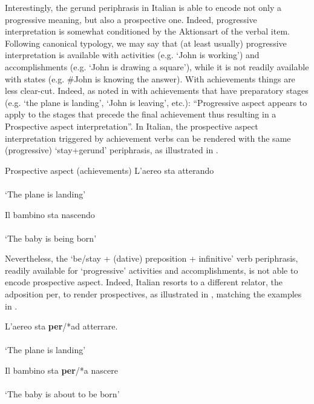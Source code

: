 \documentclass[output=paper,modfonts,nonflat,newtxmath,colorlinks,citecolor=brown]{langsci/langscibook}
\begin{document}
Interestingly, the gerund periphrasis in Italian is able to encode not only a progressive meaning, but also a prospective one. Indeed, progressive interpretation is somewhat conditioned by the Aktionsart of the verbal item. Following  canonical typology, we may say that (at least usually) progressive interpretation is available with {activities} (e.g. ‘John is working’) and {accomplishments} (e.g. ‘John is drawing a square’), while it is not readily available with {states} (e.g. \#John is knowing the answer). With {achievements} things are less clear-cut. Indeed, as noted in \citet[538]{Cinque2017} with achievements that have preparatory stages (e.g. ‘the plane is landing’, ‘John is leaving’, etc.): “Progressive aspect appears to apply to the stages that precede the final achievement thus resulting in a Prospective aspect interpretation”. In Italian, the prospective aspect interpretation triggered by achievement verbs can be rendered with the same (progressive) ‘stay+gerund’ periphrasis, as illustrated in . 

\ea Prospective aspect (achievements)%
	\label{ex:franco:22}
    \ea \label{ex:franco:22a}
    \gll L’aereo sta atterando\\
        \\
    \glt ‘The plane is landing’
    
     \ex \label{ex:franco:22b}
    \gll Il bambino sta nascendo  \\
        \\
    \glt ‘The baby is being born’
    \z
    \z
    
Nevertheless, the ‘be/stay + (dative) preposition + infinitive’ verb periphrasis, readily available for ‘progressive’ activities and accomplishments, is not able to encode prospective aspect. Indeed, Italian resorts to a different relator, the adposition {per}, to render prospectives, as illustrated in , matching the examples in .

\ea%
	\label{ex:franco:23}
    \ea \label{ex:franco:23a}
    \gll L’aereo sta \textbf{per}/*ad atterrare.\\
         \\
    \glt  ‘The plane is landing’
    
     \ex \label{ex:franco:23b}
    \gll  Il bambino sta \textbf{per}/*a nascere\\
        \\
    \glt ‘The baby is about to be born’
    \z
    \z
\end{document}
